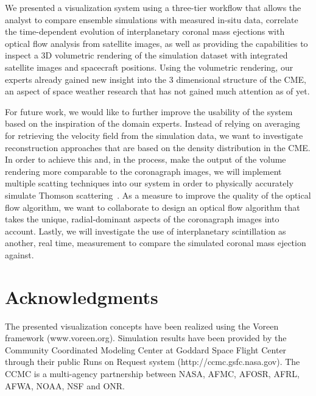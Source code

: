 \documentclass[journal]{vgtc}                %
\begin{document}
We presented a visualization system using a three-tier workflow that allows the analyst to compare ensemble simulations with measured in-situ data, correlate the time-dependent evolution of interplanetary coronal mass ejections with optical flow analysis from satellite images, as well as providing the capabilities to inspect a 3D volumetric rendering of the simulation dataset with integrated satellite images and spacecraft positions. Using the volumetric rendering, our experts already gained new insight into the 3 dimensional structure of the CME, an aspect of space weather research that has not gained much attention as of yet.

For future work, we would like to further improve the usability of the system based on the inspiration of the domain experts. Instead of relying on averaging for retrieving the velocity field from the simulation data, we want to investigate reconstruction approaches that are based on the density distribution in the CME. In order to achieve this and, in the process, make the output of the volume rendering more comparable to the coronagraph images, we will implement multiple scatting techniques into our system in order to physically accurately simulate Thomson scattering~\cite{howard2012thomson}. As a measure to improve the quality of the optical flow algorithm, we want to collaborate to design an optical flow algorithm that takes the unique, radial-dominant aspects of the coronagraph images into account. Lastly, we will investigate the use of interplanetary scintillation as another, real time, measurement to compare the simulated coronal mass ejection against.

\section*{Acknowledgments}
The presented visualization concepts have been realized using the Voreen framework (www.voreen.org). Simulation results have been provided by the Community Coordinated Modeling Center at Goddard Space Flight Center through their public Runs on Request system (http://ccmc.gsfc.nasa.gov). The CCMC is a multi-agency partnership between NASA, AFMC, AFOSR, AFRL, AFWA, NOAA, NSF and ONR.




\end{document}
